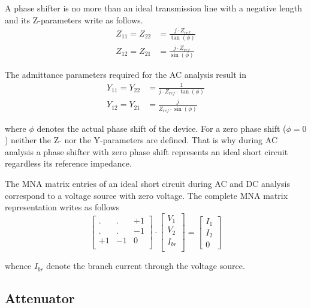A phase shifter is no more than an ideal transmission line with a
negative length and its Z-parameters write as follows.
\begin{align}
Z_{11} = Z_{22} &= \frac{j\cdot Z_{ref}}{\tan(\phi)}\\
Z_{12} = Z_{21} &= \frac{j\cdot Z_{ref}}{\sin(\phi)}
\end{align}

The admittance parameters required for the AC analysis result in
\begin{align}
Y_{11} = Y_{22} &= \frac{1}{j\cdot Z_{ref} \cdot \tan{\left(\phi\right)}}\\
Y_{12} = Y_{21} &= \frac{j}{Z_{ref}\cdot \sin{\left(\phi\right)}}
\end{align}

where $\phi$ denotes the actual phase shift of the device.  For a zero
phase shift ($\phi = 0$) neither the Z- nor the Y-parameters are
defined.  That is why during AC analysis a phase shifter with zero
phase shift represents an ideal short circuit regardless its reference
impedance.

\addvspace{12pt}

The MNA matrix entries of an ideal short circuit during AC and DC
analysis correspond to a voltage source with zero voltage.  The
complete MNA matrix representation writes as follows
\begin{equation}
\begin{bmatrix}
. & . & +1\\
. & . & -1\\
+1 & -1 & 0\\
\end{bmatrix}
\cdot
\begin{bmatrix}
V_1\\
V_2\\
I_{br}\\
\end{bmatrix}
=
\begin{bmatrix}
I_1\\
I_2\\
0
\end{bmatrix}
\end{equation}

whence $I_{br}$ denote the branch current through the voltage source.

\subsection{Attenuator}

